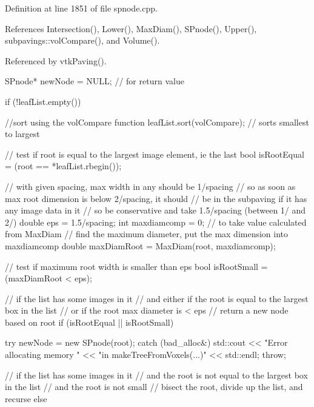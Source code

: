 \-Definition at line 1851 of file spnode.\-cpp.



\-References \-Intersection(), \-Lower(), \-Max\-Diam(), \-S\-Pnode(), \-Upper(), subpavings\-::vol\-Compare(), and \-Volume().



\-Referenced by vtk\-Paving().


\begin{DoxyCode}
    {
        SPnode* newNode = NULL;  // for return value

        if (!leafList.empty())
        {
            //sort using the volCompare function
            leafList.sort(volCompare);   // sorts smallest to largest

           // test if root is equal to the largest image element, ie the last
            bool isRootEqual = (root == *leafList.rbegin());

            // with given spacing, max width in any should be 1/spacing
            // so as soon as max root dimension is below 2/spacing, it should
            // be in the subpaving if it has any image data in it
            // so be conservative and take 1.5/spacing (between 1/ and 2/)
            double eps = 1.5/spacing;
            int maxdiamcomp = 0;  // to take value calculated from MaxDiam
            // find the maximum diameter, put the max dimension into
       maxdiamcomp
            double maxDiamRoot = MaxDiam(root, maxdiamcomp);

            // test if maximum root width is smaller than eps
            bool isRootSmall = (maxDiamRoot < eps);

            // if the list has some images in it
            // and either if the root is equal to the largest box in the list
            // or if the root max diameter is < eps
            // return a new node based on root
            if (isRootEqual || isRootSmall) {

               try {
                    newNode = new SPnode(root);
               }
                catch (bad_alloc&)
                {
                    std::cout << "Error allocating memory "
                        << "in makeTreeFromVoxels(...)" << std::endl;
                    throw;
                }
            }
            // if the list has some images in it
            // and the root is not equal to the largest box in the list
            // and the root is not small
            // bisect the root, divide up the list, and recurse
            else {

}}}
\end{DoxyCode}

